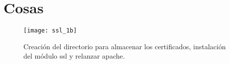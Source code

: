 
\chapter{Cosas}



\begin{figure}[h!]
\begin{center}
\caption{Creación del directorio para almacenar los certificados, instalación del módulo ssl y relanzar apache.}
\label{ssl_1}
\texttt{[image: ssl\_1b]}
\end{center}
\end{figure}

